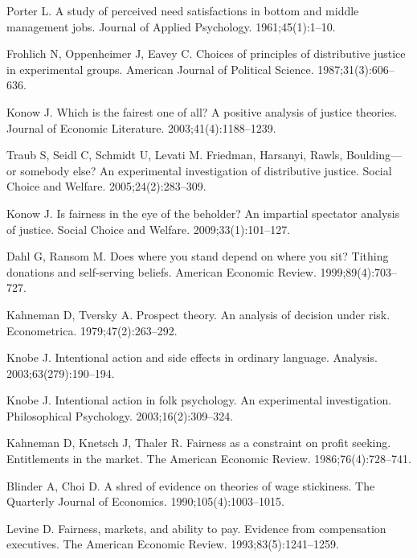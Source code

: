 \documentclass[10pt,letterpaper]{article}
\begin{document}
\begin{thebibliography}{100}
Porter L.
\newblock A study of perceived need satisfactions in bottom and middle
  management jobs.
\newblock Journal of Applied Psychology. 1961;45(1):1--10.

Frohlich N, Oppenheimer J, Eavey C.
\newblock Choices of principles of distributive justice in experimental groups.
\newblock American Journal of Political Science. 1987;31(3):606--636.

Konow J.
\newblock Which is the fairest one of all? {A} positive analysis of justice
  theories.
\newblock Journal of Economic Literature. 2003;41(4):1188--1239.

Traub S, Seidl C, Schmidt U, Levati M.
\newblock Friedman, {Harsanyi}, {Rawls}, {Boulding}---or somebody else? {An}
  experimental investigation of distributive justice.
\newblock Social Choice and Welfare. 2005;24(2):283--309.

Konow J.
\newblock Is fairness in the eye of the beholder? {An} impartial spectator
  analysis of justice.
\newblock Social Choice and Welfare. 2009;33(1):101--127.

Dahl G, Ransom M.
\newblock Does where you stand depend on where you sit? {Tithing} donations and
  self-serving beliefs.
\newblock American Economic Review. 1999;89(4):703--727.

Kahneman D, Tversky A.
\newblock Prospect theory. {An} analysis of decision under risk.
\newblock Econometrica. 1979;47(2):263--292.

Knobe J.
\newblock Intentional action and side effects in ordinary language.
\newblock Analysis. 2003;63(279):190--194.

Knobe J.
\newblock Intentional action in folk psychology. {An} experimental
  investigation.
\newblock Philosophical Psychology. 2003;16(2):309--324.

Kahneman D, Knetsch J, Thaler R.
\newblock Fairness as a constraint on profit seeking. {Entitlements} in the
  market.
\newblock The American Economic Review. 1986;76(4):728--741.

Blinder A, Choi D.
\newblock A shred of evidence on theories of wage stickiness.
\newblock The Quarterly Journal of Economics. 1990;105(4):1003--1015.

Levine D.
\newblock Fairness, markets, and ability to pay. {Evidence} from compensation
  executives.
\newblock The American Economic Review. 1993;83(5):1241--1259.


\end{thebibliography}
\end{document}
